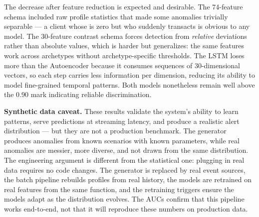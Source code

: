 The decrease after feature reduction is expected and desirable. The 74-feature schema included raw profile statistics that made some anomalies trivially separable --- a client whose  is zero but who suddenly transacts is obvious to any model. The 30-feature contrast schema forces detection from \emph{relative} deviations rather than absolute values, which is harder but generalizes: the same features work across archetypes without archetype-specific thresholds. The LSTM loses more than the Autoencoder because it consumes sequences of 30-dimensional vectors, so each step carries less information per dimension, reducing its ability to model fine-grained temporal patterns. Both models nonetheless remain well above the 0.90 mark indicating reliable discrimination.

\textbf{Synthetic data caveat.} These results validate the system's ability to learn patterns, serve predictions at streaming latency, and produce a realistic alert distribution --- but they are not a production benchmark. The generator produces anomalies from known scenarios with known parameters, while real anomalies are messier, more diverse, and not drawn from the same distribution. The engineering argument is different from the statistical one: plugging in real data requires no code changes. The generator is replaced by real event sources, the batch pipeline rebuilds profiles from real history, the models are retrained on real features from the same  function, and the retraining triggers ensure the models adapt as the distribution evolves. The AUCs confirm that this pipeline works end-to-end, not that it will reproduce these numbers on production data.
